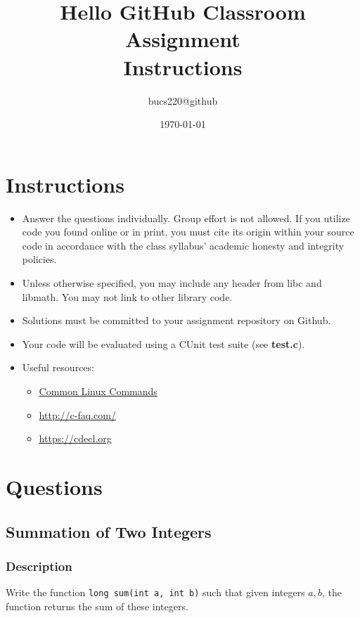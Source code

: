 \documentclass{article}
\begin{document}
  \title{Hello GitHub Classroom Assignment \\ Instructions}
  \author{bucs220@github}
  \date{\today}
  \maketitle

\section{Instructions}
\begin{itemize}
  \item Answer the questions individually. Group effort is not allowed. If you utilize code you found online or in print, you must cite its origin within your source code in accordance with the class syllabus' academic honesty and integrity policies.
  \item Unless otherwise specified, you may include any header from libc and libmath. You may not link to other library code.
  \item Solutions must be committed to your assignment repository on Github.
  \item Your code will be evaluated using a CUnit test suite (see {\bf test.c}).
  \item Useful resources:
  \begin{itemize}
    \item \href{http://www.informit.com/blogs/blog.aspx?uk=The-10-Most-Important-Linux-Commands}{Common Linux Commands}
    \item \url{http://c-faq.com/}
    \item \url{https://cdecl.org}
  \end{itemize}
\end{itemize}

\section{Questions}

\subsection{Summation of Two Integers}
\subsubsection{Description}
Write the function {\tt long sum(int a, int b)} such that given integers $a,b$, the function returns the sum of these integers.
\end{document}

